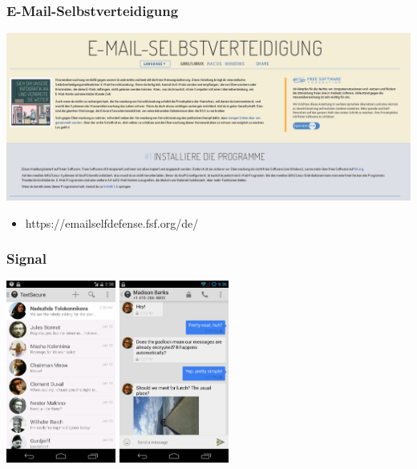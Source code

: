 \documentclass[12pt]{beamer}
\begin{document}
\begin{frame}
  \frametitle{E-Mail-Selbstverteidigung}
  \begin{center}
    \includegraphics[height=0.5\textheight]{img/emailselfdefense.png}
    \begin{itemize}
      \item https://emailselfdefense.fsf.org/de/
    \end{itemize}
  \end{center}
\end{frame}

\begin{frame}
  \frametitle{Signal}
    \begin{center}
      \includegraphics[height=6cm]{img/textsecure1.png}
      \hspace{0.5cm}
      \includegraphics[height=6cm]{img/textsecure2.png}
    \end{center}
\end{frame}
\end{document}
